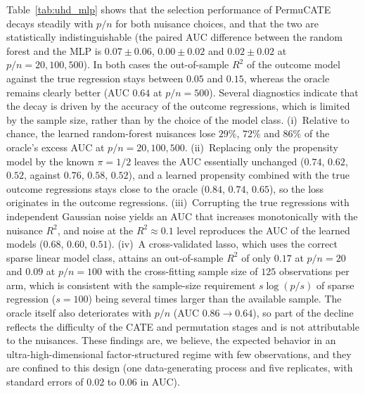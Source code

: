 Table~\ref{tab:uhd_mlp} shows that the selection performance of PermuCATE decays steadily with $p/n$ for both nuisance choices, and that the two are statistically indistinguishable (the paired AUC difference between the random forest and the MLP is $0.07 \pm 0.06$, $0.00 \pm 0.02$ and $0.02 \pm 0.02$ at $p/n = 20, 100, 500$). In both cases the out-of-sample $R^2$ of the outcome model against the true regression stays between $0.05$ and $0.15$, whereas the oracle remains clearly better (AUC $0.64$ at $p/n = 500$). Several diagnostics indicate that the decay is driven by the accuracy of the outcome regressions, which is limited by the sample size, rather than by the choice of the model class. (i)~Relative to chance, the learned random-forest nuisances lose $29\%$, $72\%$ and $86\%$ of the oracle's excess AUC at $p/n = 20, 100, 500$. (ii)~Replacing only the propensity model by the known $\pi = 1/2$ leaves the AUC essentially unchanged ($0.74$, $0.62$, $0.52$, against $0.76$, $0.58$, $0.52$), and a learned propensity combined with the true outcome regressions stays close to the oracle ($0.84$, $0.74$, $0.65$), so the loss originates in the outcome regressions. (iii)~Corrupting the true regressions with independent Gaussian noise yields an AUC that increases monotonically with the nuisance $R^2$, and noise at the $R^2 \approx 0.1$ level reproduces the AUC of the learned models ($0.68$, $0.60$, $0.51$). (iv)~A cross-validated lasso, which uses the correct sparse linear model class, attains an out-of-sample $R^2$ of only $0.17$ at $p/n = 20$ and $0.09$ at $p/n = 100$ with the cross-fitting sample size of $125$ observations per arm, which is consistent with the sample-size requirement $s\log(p/s)$ of sparse regression ($s = 100$) being several times larger than the available sample. The oracle itself also deteriorates with $p/n$ (AUC $0.86 \to 0.64$), so part of the decline reflects the difficulty of the CATE and permutation stages and is not attributable to the nuisances. These findings are, we believe, the expected behavior in an ultra-high-dimensional factor-structured regime with few observations, and they are confined to this design (one data-generating process and five replicates, with standard errors of $0.02$ to $0.06$ in AUC).

